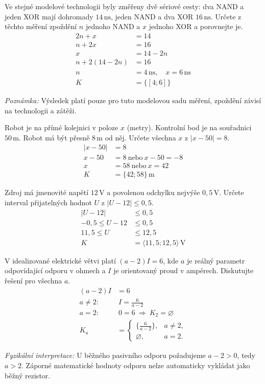 \documentclass[11pt,a4paper]{article}
\begin{document}
\begin{prikladReseniBox}[title={Příklad 3}]
Ve stejné modelové technologii byly změřeny dvě sériové cesty: dva NAND a jeden XOR mají dohromady $14\,\mathrm{ns}$, jeden NAND a dva XOR $16\,\mathrm{ns}$. Určete z těchto měření zpoždění $n$ jednoho NAND a $x$ jednoho XOR a porovnejte je.
\tcblower
\[\begin{aligned}
2n+x&=14\\n+2x&=16\\x&=14-2n\\n+2(14-2n)&=16\\n&=4\,\mathrm{ns},\quad x=6\,\mathrm{ns}\\K&=\{[4;6]\}
\end{aligned}\]
\par\textit{Poznámka:} Výsledek platí pouze pro tuto modelovou sadu měření, zpoždění závisí na technologii a zátěži.
\end{prikladReseniBox}
\begin{prikladReseniBox}[title={Příklad 4}]
Robot je na přímé kolejnici v poloze $x$ (metry). Kontrolní bod je na souřadnici $50\,\mathrm m$. Robot má být přesně $8\,\mathrm m$ od něj. Určete všechna $x$ z $|x-50|=8$.
\tcblower
\[\begin{aligned}
|x-50|&=8\\x-50&=8\ \text{nebo}\ x-50=-8\\x&=58\ \text{nebo}\ x=42\\K&=\{42;58\}\,\mathrm m
\end{aligned}\]
\end{prikladReseniBox}
\begin{prikladReseniBox}[title={Příklad 5}]
Zdroj má jmenovité napětí $12\,\mathrm V$ a povolenou odchylku nejvýše $0{,}5\,\mathrm V$. Určete interval přijatelných hodnot $U$ z $|U-12|\le0{,}5$.
\tcblower
\[\begin{aligned}
|U-12|&\le0{,}5\\-0{,}5\le U-12&\le0{,}5\\11{,}5\le U&\le12{,}5\\K&=\langle11{,}5;12{,}5\rangle\,\mathrm V
\end{aligned}\]
\end{prikladReseniBox}
\begin{prikladReseniBox}[title={Příklad 6}]
V idealizované elektrické větvi platí $(a-2)I=6$, kde $a$ je reálný parametr odpovídající odporu v ohmech a $I$ je orientovaný proud v ampérech. Diskutujte řešení pro všechna $a$.
\tcblower
\[\begin{aligned}
(a-2)I&=6\\a\ne2:&\ I=\frac6{a-2}\\a=2:&\ 0=6\ \Rightarrow\ K_2=\varnothing\\K_a&=\begin{cases}\{\frac6{a-2}\},&a\ne2,\\\varnothing,&a=2.\end{cases}
\end{aligned}\]
\par\textit{Fyzikální interpretace:} U běžného pasivního odporu požadujeme $a-2>0$, tedy $a>2$. Záporné matematické hodnoty odporu nelze automaticky vykládat jako běžný rezistor.
\end{prikladReseniBox}
\end{document}
